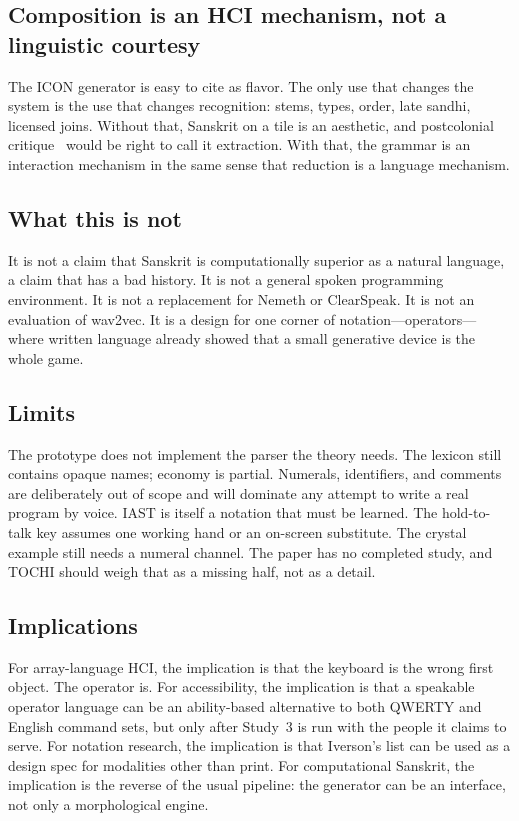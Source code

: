 \documentclass[manuscript, review, anonymous]{acmart}
\begin{document}
\subsection{Composition is an HCI mechanism, not a linguistic courtesy}

The ICON generator is easy to cite as flavor. The only use that changes the system is the use that changes recognition: stems, types, order, late sandhi, licensed joins. Without that, Sanskrit on a tile is an aesthetic, and postcolonial critique~\cite{Irani2010CHI} would be right to call it extraction. With that, the grammar is an interaction mechanism in the same sense that reduction is a language mechanism.

\subsection{What this is not}

It is not a claim that Sanskrit is computationally superior as a natural language, a claim that has a bad history. It is not a general spoken programming environment. It is not a replacement for Nemeth or ClearSpeak. It is not an evaluation of wav2vec. It is a design for one corner of notation---operators---where written language already showed that a small generative device is the whole game.

\subsection{Limits}

The prototype does not implement the parser the theory needs. The lexicon still contains opaque names; economy is partial. Numerals, identifiers, and comments are deliberately out of scope and will dominate any attempt to write a real program by voice. IAST is itself a notation that must be learned. The hold-to-talk key assumes one working hand or an on-screen substitute. The crystal example still needs a numeral channel. The paper has no completed study, and TOCHI should weigh that as a missing half, not as a detail.

\subsection{Implications}

For array-language HCI, the implication is that the keyboard is the wrong first object. The operator is. For accessibility, the implication is that a speakable operator language can be an ability-based alternative to both QWERTY and English command sets, but only after Study~3 is run with the people it claims to serve. For notation research, the implication is that Iverson's list can be used as a design spec for modalities other than print. For computational Sanskrit, the implication is the reverse of the usual pipeline: the generator can be an interface, not only a morphological engine.
\end{document}
